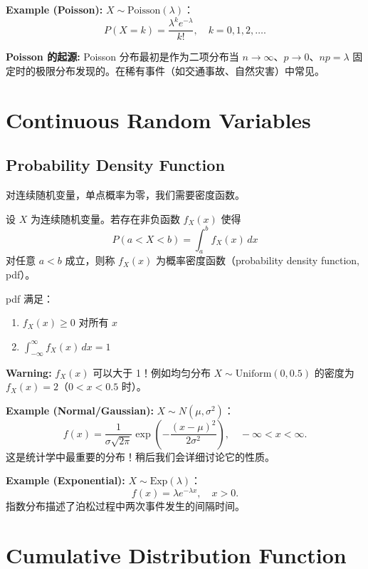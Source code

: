 \textbf{Example (Poisson):} $X \sim \text{Poisson}(\lambda)$：
\[
P(X = k) = \frac{\lambda^k e^{-\lambda}}{k!}, \quad k = 0, 1, 2, \ldots.
\]

\bigskip

\textbf{Poisson 的起源:} Poisson 分布最初是作为二项分布当 $n \to \infty$、$p \to 0$、$np = \lambda$ 固定时的极限分布发现的。在稀有事件（如交通事故、自然灾害）中常见。

\section{Continuous Random Variables}\label{sec:continuous-rv}

\subsection{Probability Density Function}\label{sub:pdf}

对连续随机变量，单点概率为零，我们需要密度函数。

\begin{Definition}[概率密度函数]\label{def:pdf}
设 $X$ 为连续随机变量。若存在非负函数 $f_X(x)$ 使得
\[
P(a < X < b) = \int_a^b f_X(x) \, dx
\]
对任意 $a < b$ 成立，则称 $f_X(x)$ 为概率密度函数（probability density function, pdf）。
\end{Definition}

pdf 满足：
\begin{enumerate}
    \item $f_X(x) \geq 0$ 对所有 $x$
    \item $\int_{-\infty}^{\infty} f_X(x) \, dx = 1$
\end{enumerate}

\textbf{Warning:} $f_X(x)$ 可以大于 1！例如均匀分布 $X \sim \text{Uniform}(0, 0.5)$ 的密度为 $f_X(x) = 2$（$0 < x < 0.5$ 时）。

\bigskip

\textbf{Example (Normal/Gaussian):} $X \sim N(\mu, \sigma^2)$：
\[
f(x) = \frac{1}{\sigma\sqrt{2\pi}} \exp\left(-\frac{(x-\mu)^2}{2\sigma^2}\right), \quad -\infty < x < \infty.
\]
这是统计学中最重要的分布！稍后我们会详细讨论它的性质。

\textbf{Example (Exponential):} $X \sim \text{Exp}(\lambda)$：
\[
f(x) = \lambda e^{-\lambda x}, \quad x > 0.
\]
指数分布描述了泊松过程中两次事件发生的间隔时间。

\section{Cumulative Distribution Function}\label{sec:cdf}

